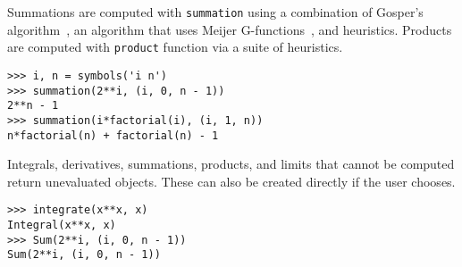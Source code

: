 Summations are computed with \verb|summation|  using a combination of Gosper's
algorithm~\cite{gosper1978decision}, an algorithm that uses Meijer
G-functions~\cite{Roach1996hyper,roach1997meijerg}, and heuristics. Products
are computed with \verb|product| function via a suite of heuristics.
\begin{verbatim}
>>> i, n = symbols('i n')
>>> summation(2**i, (i, 0, n - 1))
2**n - 1
>>> summation(i*factorial(i), (i, 1, n))
n*factorial(n) + factorial(n) - 1
\end{verbatim}

Integrals, derivatives, summations, products, and limits that cannot be
computed return unevaluated objects. These can also be created directly if the
user chooses.
\begin{verbatim}
>>> integrate(x**x, x)
Integral(x**x, x)
>>> Sum(2**i, (i, 0, n - 1))
Sum(2**i, (i, 0, n - 1))
\end{verbatim}
